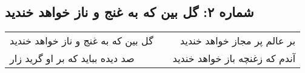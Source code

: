 \begin{center}
\section*{شماره ۲: گل بین که به غنج و ناز خواهد خندید}
\label{sec:002}
\begin{longtable}{l p{0.5cm} r}
گل بین که به غنج و ناز خواهد خندید
&&
بر عالم پر مجاز خواهد خندید
\\
صد دیده بباید که بر او گرید زار
&&
آندم که زغنچه باز خواهد خندید
\\
\end{longtable}
\end{center}
